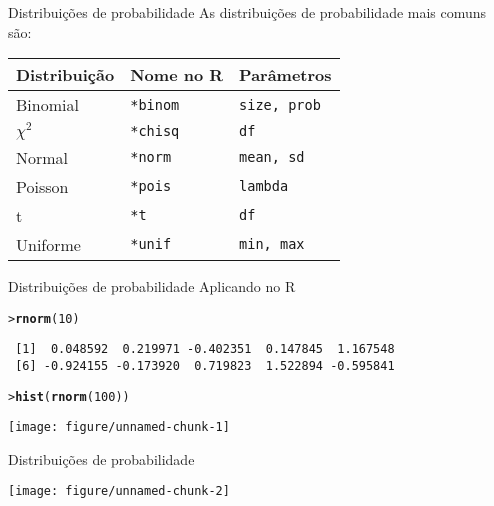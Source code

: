 \documentclass[10pt]{beamer}\usepackage{graphicx, color}
\makeatletter
\newcommand{\hlfunctioncall}[1]{\textcolor[rgb]{0,0,0.545098039215686}{\textbf{#1}}}%
\newenvironment{kframe}{%
 \def\at@end@of@kframe{}%
 \ifinner\ifhmode%
  \def\at@end@of@kframe{\end{minipage}}%
  \begin{minipage}{\columnwidth}%
 \fi\fi%
 \def\FrameCommand##1{\hskip\@totalleftmargin \hskip-\fboxsep
 \colorbox{shadecolor}{##1}\hskip-\fboxsep
     \hskip-\linewidth \hskip-\@totalleftmargin \hskip\columnwidth}%
 \MakeFramed {\advance\hsize-\width
   \@totalleftmargin\z@ \linewidth\hsize
   \@setminipage}}%
 {\par\unskip\endMakeFramed%
 \at@end@of@kframe}
\newenvironment{knitrout}{}{} %
\providecommand{\R}{\textsf{R}\xspace}
\makeatother
\begin{document}
\begin{frame}[fragile=singleslide]{Distribuições de probabilidade}
As distribuições de probabilidade mais comuns são:
\begin{center}
\begin{tabular}{lll}
\hline
Distribuição & Nome no \R & Parâmetros \\
\hline
Binomial & \texttt{*binom} & \texttt{size, prob} \\
$\chi^2$ & \texttt{*chisq} & \texttt{df} \\

Normal & \texttt{*norm} & \texttt{mean, sd} \\
Poisson & \texttt{*pois} & \texttt{lambda} \\
t & \texttt{*t} & \texttt{df} \\
Uniforme & \texttt{*unif} & \texttt{min, max}\\
\hline
\end{tabular}
\end{center}
\end{frame}

\begin{frame}[fragile=singleslide]{Distribuições de probabilidade}
Aplicando no R
\begin{knitrout}\small
{}\color{fgcolor}\begin{kframe}
\begin{alltt}
> \hlfunctioncall{rnorm}(10)
\end{alltt}
\begin{verbatim}
 [1]  0.048592  0.219971 -0.402351  0.147845  1.167548
 [6] -0.924155 -0.173920  0.719823  1.522894 -0.595841
\end{verbatim}
\begin{alltt}
> \hlfunctioncall{hist}(\hlfunctioncall{rnorm}(100))
\end{alltt}
\end{kframe}

{\centering \texttt{[image: figure/unnamed-chunk-1]} 

}



\end{knitrout}

\end{frame}

\begin{frame}[fragile=singleslide]{Distribuições de probabilidade}
\begin{knitrout}\small
{}\color{fgcolor}

{\centering \texttt{[image: figure/unnamed-chunk-2]} 

}



\end{knitrout}

\end{frame}
\end{document}
